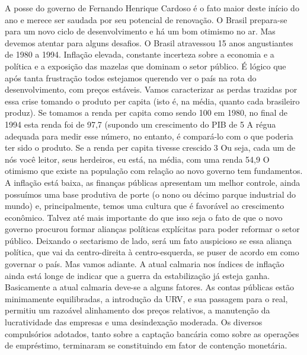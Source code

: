 A posse do governo de Fernando Henrique Cardoso é o fato maior deste início do ano e merece ser saudada por seu potencial de renovação. O Brasil prepara-se para um novo ciclo de desenvolvimento e há um bom otimismo no ar. Mas devemos atentar para alguns desafios.
O Brasil atravessou 15 anos angustiantes de 1980 a 1994. Inflação elevada, constante incerteza sobre a economia e a política e a exposição das mazelas que dominam o setor público. É lógico que após tanta frustração todos estejamos querendo ver o país na rota do desenvolvimento, com preços estáveis.
Vamos caracterizar as perdas trazidas por essa crise tomando o produto per capita (isto é, na média, quanto cada brasileiro produz). Se tomamos a renda per capita como sendo 100 em 1980, no final de 1994 esta renda foi de 97,7 (supondo um crescimento do PIB de 5%
A régua adequada para medir esse número, no entanto, é compará-lo com o que poderia ter sido o produto. Se a renda per capita tivesse crescido 3%
Ou seja, cada um de nós você leitor, seus herdeiros, eu está, na média, com uma renda 54,9%
O otimismo que existe na população com relação ao novo governo tem fundamentos. A inflação está baixa, as finanças públicas apresentam um melhor controle, ainda possuímos uma base produtiva de porte (o nono ou décimo parque industrial do mundo) e, principalmente, temos uma cultura que é favorável ao crescimento econômico.
Talvez até mais importante do que isso seja o fato de que o novo governo procurou formar alianças políticas explícitas para poder reformar o setor público. Deixando o sectarismo de lado, será um fato auspicioso se essa aliança política, que vai da centro-direita à centro-esquerda, se puser de acordo em como governar o país.
Mas vamos adiante. A atual calmaria nos índices de inflação ainda está longe de indicar que a guerra da estabilização já esteja ganha. Basicamente a atual calmaria deve-se a alguns fatores.
As contas públicas estão minimamente equilibradas, a introdução da URV, e sua passagem para o real, permitiu um razoável alinhamento dos preços relativos, a manutenção da lucratividade das empresas e uma desindexação moderada. Os diversos compulsórios adotados, tanto sobre a captação bancária como sobre as operações de empréstimo, terminaram se constituindo em fator de contenção monetária.
